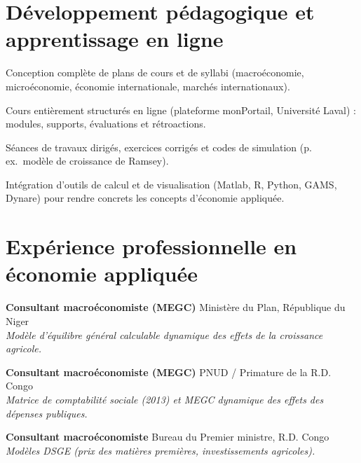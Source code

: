 \documentclass[11pt,letterpaper]{article}
\newenvironment{datelist}
  {\begin{description}[style=multiline,leftmargin=2.75cm,labelwidth=2.55cm,
     labelsep=0.2cm,font=\normalfont\small\color{soft},
     itemsep=0.45em,topsep=0.25em,parsep=0.15em]}
  {\end{description}}
\newcommand{\dotsep}{\;\textcolor{soft}{\textbullet}\;}
\newcommand{\meta}[1]{{\small\itshape\color{soft}#1}}
\begin{document}
\section{Développement pédagogique et apprentissage en ligne}
\begin{tight}
  \item Conception complète de plans de cours et de syllabi (macroéconomie, microéconomie, économie internationale, marchés internationaux).
  \item Cours entièrement structurés en ligne (plateforme monPortail, Université Laval) : modules, supports, évaluations et rétroactions.
  \item Séances de travaux dirigés, exercices corrigés et codes de simulation (p.\,ex.\ modèle de croissance de Ramsey).
  \item Intégration d'outils de calcul et de visualisation (Matlab, R, Python, GAMS, Dynare) pour rendre concrets les concepts d'économie appliquée.
\end{tight}
\section{Expérience professionnelle en économie appliquée}
\begin{datelist}
  \item[2018--2019] \textbf{Consultant macroéconomiste (MEGC)} \dotsep Ministère du Plan, République du Niger\\
    \meta{Modèle d'équilibre général calculable dynamique des effets de la croissance agricole.}
  \item[2016--2017] \textbf{Consultant macroéconomiste (MEGC)} \dotsep PNUD / Primature de la R.D. Congo\\
    \meta{Matrice de comptabilité sociale (2013) et MEGC dynamique des effets des dépenses publiques.}
  \item[2013--2015] \textbf{Consultant macroéconomiste} \dotsep Bureau du Premier ministre, R.D. Congo\\
    \meta{Modèles DSGE (prix des matières premières, investissements agricoles).}
\end{datelist}
\end{document}
